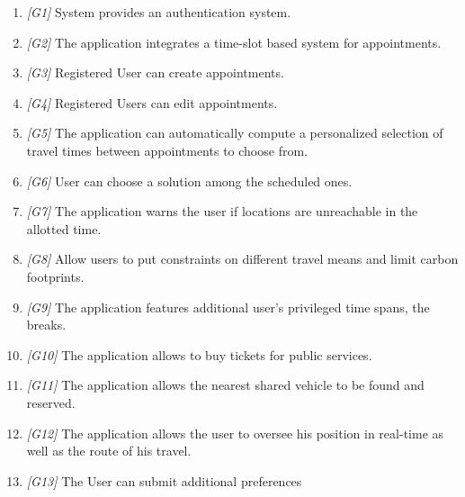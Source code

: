 \begin{enumerate}
	\item \textit{[G1]} 
		System provides an authentication system.
	\item \textit{[G2]} The application integrates a time-slot based system for appointments.
	\item \textit{[G3]} Registered User can create appointments. 
	\item \textit{[G4]} Registered Users can edit appointments.
	\item \textit{[G5]} The application can automatically compute a personalized selection of travel times between appointments to choose from.
	\item \textit{[G6]} User can choose a solution among the scheduled ones.
	\item \textit{[G7]} The application warns the user if locations are unreachable in the allotted time.
	\item \textit{[G8]} Allow users to put constraints on different travel means and limit carbon footprints.
	\item \textit{[G9]} The application features additional user’s privileged time spans, the breaks.
	\item \textit{[G10]} The application allows to buy tickets for public services.
	\item \textit{[G11]} The application allows the nearest shared vehicle to be found and reserved.
	\item \textit{[G12]} The application allows the user to oversee his position in real-time as well as the route of his travel.
	\item \textit{[G13]} The User can submit additional preferences
		
\end{enumerate}	

